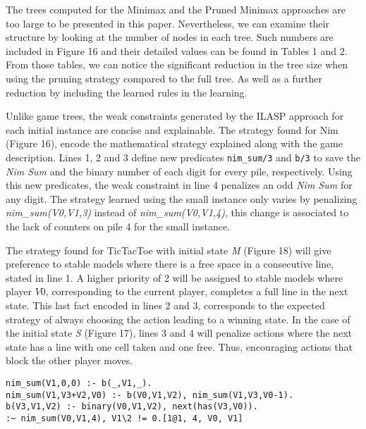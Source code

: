 The trees computed for the Minimax and the Pruned Minimax approaches are too large to be presented in this paper. Nevertheless, we can examine their structure by looking at the number of nodes in each tree. Such numbers are included in Figure 16 and their detailed values can be found in Tables 1 and 2. From those tables, we can notice the significant reduction in the tree size when using the pruning strategy compared to the full tree. As well as a further reduction by including the learned rules in the learning.

Unlike game trees, the weak constraints generated by the ILASP approach for each initial instance are concise and explainable. The strategy found for Nim (Figure 16), encode the mathematical strategy explained along with the game description. Lines 1, 2 and 3 define new predicates \texttt{nim\_sum/3} and \texttt{b/3} to save the \textit{Nim Sum} and the binary number of each digit for every pile, respectively. Using this new predicates, the weak constraint in line 4 penalizes an odd \textit{Nim Sum} for any digit. The strategy learned using the small instance only varies by penalizing \textit{nim\_sum(V0,V1,3)} instead of \textit{nim\_sum(V0,V1,4)}, this change is associated to the lack of counters on pile 4 for the small instance. 

The strategy found for TicTacToe with initial state \textit{M} (Figure 18) will give preference to stable models where there is a free space in a consecutive line, stated in line 1. A higher priority of 2 will be assigned to stable models where player $V0$, corresponding to the current player, completes a full line in the next state. This last fact encoded in lines 2 and 3, corresponds to the expected strategy of always choosing the action leading to a winning state. In the case of the initial state \textit{S} (Figure 17), lines 3 and 4 will penalize actions where the next state has a line with one cell taken and one free. Thus, encouraging actions that block the other player moves.  

\begin{center}
    \begin{lstlisting}[] 
nim_sum(V1,0,0) :- b(_,V1,_).
nim_sum(V1,V3+V2,V0) :- b(V0,V1,V2), nim_sum(V1,V3,V0-1).
b(V3,V1,V2) :- binary(V0,V1,V2), next(has(V3,V0)).
:~ nim_sum(V0,V1,4), V1\2 != 0.[1@1, 4, V0, V1]
    \end{lstlisting}
\end{center}

